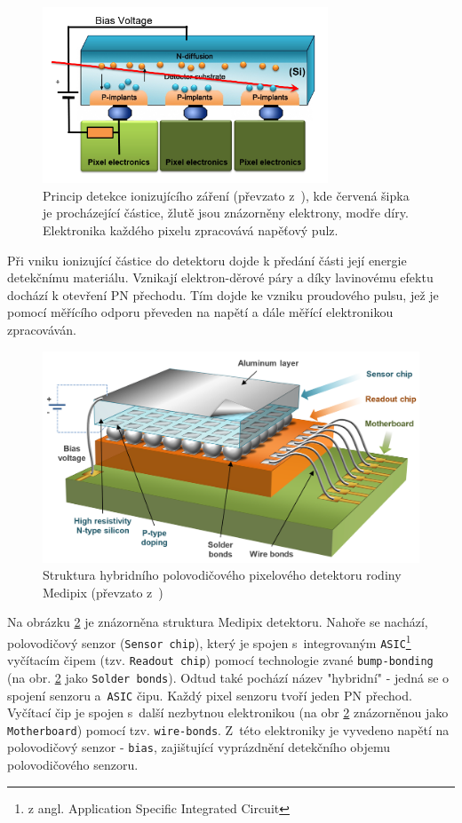 \begin{figure}[th]
	\begin{center}
		\includegraphics[width=8.5cm]{figures/det_recombination.png}
		\caption{Princip detekce ionizujícího záření (převzato z~\cite{PlatkevicDisertace}), kde červená šipka je procházející částice, žlutě jsou znázorněny elektrony, modře díry. Elektronika každého pixelu zpracovává napěťový pulz.}
		\label{fig:det:recomb}
	\end{center}
\end{figure}
Při vniku ionizující částice do detektoru dojde k předání části její energie detekčnímu materiálu. Vznikají elektron-děrové páry a díky lavinovému efektu dochází k otevření PN přechodu. Tím dojde ke vzniku proudového pulsu, jež je pomocí měřícího odporu převeden na napětí a dále měřící elektronikou zpracováván.

\begin{figure}[th]
	\begin{center}
		\includegraphics[width=12cm]{figures/det_chip.png}
		\caption{Struktura hybridního polovodičového pixelového detektoru rodiny Medipix (převzato z~\cite{PlatkevicDisertace})}
		\label{fig:det:chip}
	\end{center}
\end{figure}

Na obrázku \ref{fig:det:chip} je znázorněna struktura Medipix detektoru. Nahoře se nachází, polovodičový senzor (\texttt{Sensor chip}), který je spojen s~integrovaným \texttt{ASIC}\footnote{z angl. Application Specific Integrated Circuit} vyčítacím čipem (tzv. \texttt{Readout chip}) pomocí technologie zvané \texttt{bump-bonding} (na obr. \ref{fig:det:chip} jako \texttt{Solder bonds}). Odtud také pochází název "hybridní" - jedná se o spojení senzoru a~\texttt{ASIC} čipu. Každý pixel senzoru tvoří jeden PN přechod. Vyčítací čip je spojen s~další nezbytnou elektronikou (na obr \ref{fig:det:chip} znázorněnou jako \texttt{Motherboard}) pomocí tzv. \texttt{wire-bonds}. Z~této elektroniky je vyvedeno napětí na polovodičový senzor - \texttt{bias}, zajištující vyprázdnění detekčního objemu polovodičového senzoru.


